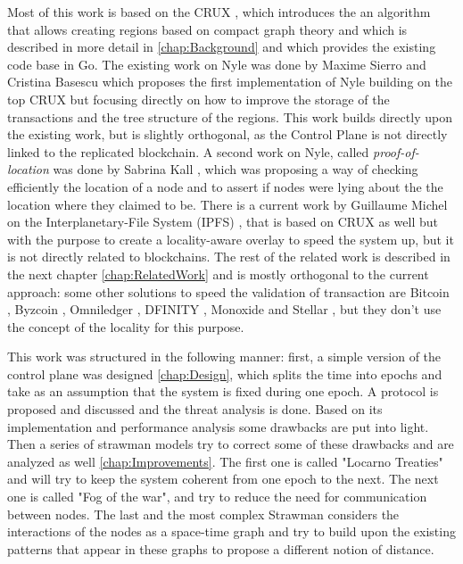 \documentclass[a4paper,11pt,oneside]{report}
\begin{document}
Most of this work is based on the CRUX \cite{Basescu2014}, which introduces the
an algorithm that allows creating regions based on compact graph theory and which is
described in more detail in \autoref{chap:Background} and which provides the existing code base in Go. The existing work on
Nyle was done by Maxime Sierro and Cristina Basescu \cite{Sierro2019} which
proposes the first implementation of Nyle building on the top CRUX
\cite{Basescu2014} but focusing directly on how to improve the storage of the
transactions and the tree structure of the regions. This work builds directly
upon the existing work, but is slightly orthogonal, as the Control Plane is
not directly linked to the replicated blockchain. A second work on Nyle, called \textit{proof-of-location} was
done by Sabrina Kall \cite{Kall2019}, which was proposing a way of checking
efficiently the location of a node and to assert if nodes were lying about the
the location where they claimed to be. There is a current work by Guillaume Michel on the
Interplanetary-File System (IPFS) \cite{Michel2019}, that is based on CRUX as
well but with the purpose to create a locality-aware overlay to speed the
system up, but it is not directly related to blockchains. The rest of the
related work is described in the next chapter \autoref{chap:RelatedWork} and is
mostly orthogonal to the current approach: some other solutions to speed the
validation of transaction are Bitcoin \cite{Nakamoto2009}, Byzcoin
\cite{Kogias2016}, Omniledger \cite{Kokoris-Kogias2017}, DFINITY
\cite{Hanke2018}, Monoxide \cite{Wang2019} and Stellar \cite{Lokhava2019}, but
they don't use the concept of the locality for this purpose. 

This work was structured in the following manner: first, a simple version of
the control plane was designed \autoref{chap:Design}, which splits the time into
epochs and take as an assumption that the system is fixed during one epoch. A
protocol is proposed and discussed and the threat analysis is done. Based on
its implementation and performance analysis some drawbacks are put into light.
Then a series of strawman models try to correct some of these drawbacks and are
analyzed as well \autoref{chap:Improvements}. The first one is called "Locarno
Treaties" and will try to keep the system coherent from one epoch to the next.
The next one is called "Fog of the war", and try to reduce the need for
communication between nodes. The last and the most complex Strawman considers the
interactions of the nodes as a space-time graph and try to build upon the
existing patterns that appear in these graphs to propose a different notion of distance. 
\end{document}
